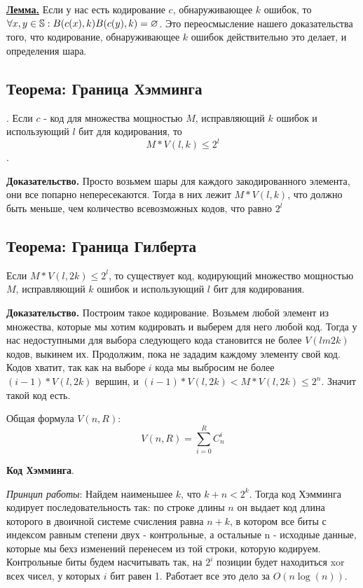 \underline{\textbf{Лемма.}} Если у нас есть кодирование $c$, обнаруживающее $k$ ошибок, то $\forall x,y \in \mathbb{S}: B(c(x), k) \mathclap{} B(c(y),k) = \varnothing$. Это переосмысление нашего доказательства того, что кодирование, обнаруживающее $k$ ошибок действительно это делает, и определения шара.

\subsection{Теорема: Граница Хэмминга}. Если $c$  - код для множества мощностью $M$, исправляющий $k$ ошибок и использующий $l$ бит для кодирования, то $$M*V(l, k)\leq 2^l$$. 

\textbf{Доказательство.} Просто возьмем шары для каждого закодированного элемента, они все попарно непересекаются. Тогда в них лежит $M*V(l, k)$, что должно быть меньше, чем количество всевозможных кодов, что равно $2^l$

\subsection{Теорема: Граница Гилберта} Если $M*V(l, 2k)\leq 2^l$, то существует код, кодирующий множество мощностью $M$, исправляющий $k$ ошибок и использующий $l$ бит для кодирования.  

\textbf{Доказательство.} Построим такое кодирование. Возьмем любой элемент из множества, которые мы хотим кодировать и выберем для него любой код. Тогда у нас недоступными для выбора следующего кода становится не более $V(lm 2k)$ кодов, выкинем их. Продолжим, пока не зададим каждому элементу свой код. Кодов хватит, так как на выборе $i$ кода мы выбросим не более $(i - 1)*V(l, 2k)$ вершин, и $(i - 1)*V(l, 2k) < M*V(l, 2k)\leq 2^n$. Значит такой код есть.

Общая формула $V(n, R)$: $$V(n, R) = \sum\limits_{i=0}^{R} C_n^i$$

\textbf{Код Хэмминга}. 

\textit{Принцип работы}: Найдем наименьшее $k$, что $k + n < 2^k$. Тогда код Хэмминга кодирует последовательность так: по строке длины $n$ он выдает код длина которого в двоичной системе счисления равна $n + k$, в котором все биты с индексом равным степени двух - контрольные, а остальные n - исходные данные, которые мы бехз изменений перенесем из той строки, которую кодируем. Контрольные биты будем насчитывать так, на $2^i$ позиции будет находиться xor всех чисел, у которых $i$ бит равен 1. Работает все это дело за $O(n\log(n))$.

